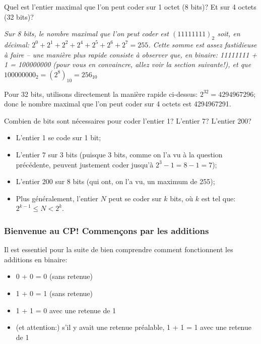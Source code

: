 \documentclass[12pt]{article}
\newenvironment{MaReponse}
		{\begin{greyedtextbox}\itshape} %
		{\end{greyedtextbox}}            %
\begin{document}
	 \begin{MonExo}
	 	Quel est l'entier maximal que l'on peut coder sur 1 octet (8 bits)? Et sur 4 octets (32 bits)?
	 \end{MonExo}
	\begin{MaReponse}
		Sur 8 bits, le nombre maximal que l'on peut coder est $(11111111)_2$ soit, en décimal: $2^0 + 2^1 + 2^2 + 2^4 + 2^5 + 2^6 + 2^7=255$. Cette somme est assez fastidieuse à faire -- une manière plus rapide consiste à observer que, en binaire: 11111111 + 1 = 100000000 (pour vous en convaincre, allez voir la section suivante!), et que $100000000_2 = (2^8)_{10} = 256_{10}$
		
		Pour 32 bits, utilisons directement la manière rapide ci-dessus: $2^32=4294967296$; donc le nombre maximal que l'on peut coder sur 4 octets est 4294967291.
	\end{MaReponse}
	 
	 \begin{MonExo}[et à l'inverse...]
	 	Combien de bits sont nécessaires pour coder l'entier 1? L'entier 7? L'entier 200?
	 \end{MonExo}
	 \begin{MaReponse}
	 	\begin{itemize}
	 		\item L'entier 1 se code sur 1 bit;
	 		\item L'entier 7 sur 3 bits (puisque 3 bits, comme on l'a vu à la question précédente, peuvent justement coder jusqu'à $2^3 - 1 = 8 - 1 = 7$);
	 		\item L'entier 200 sur 8 bits (qui ont, on l'a vu, un maximum de 255);
	 		\item Plus généralement, l'entier $N$ peut se coder sur $k$ bits, où $k$ est tel que: $2^{k-1} \le N < 2^k$.
	 	\end{itemize}
	 	 
	 \end{MaReponse}
	 
	 \subsubsection*{Bienvenue au CP! Commençons par les additions}
	 Il est essentiel pour la suite de bien comprendre comment fonctionnent les additions en binaire:
	 \begin{itemize}
	 	\item 0 + 0 = 0 (sans retenue)
	 	\item 1 + 0 = 1 (sans retenue)
	 	\item 1 + 1 = 0 avec une retenue de 1
	 	\item (et attention:) s'il y avait une retenue préalable, 1 + 1 = 1 avec une retenue de 1
	 \end{itemize}
	 
\end{document}
